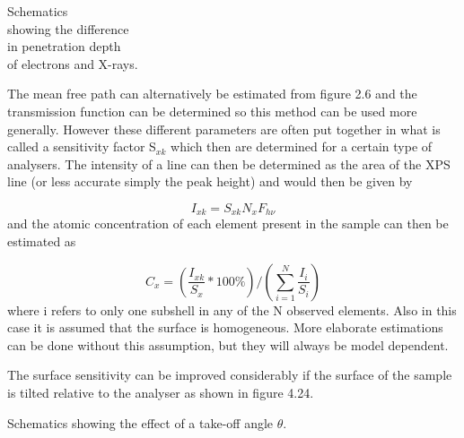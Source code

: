              Schematics\\ showing the
        difference\\ in penetration depth\\ of electrons and X-rays.\\

\vspace{9cm}


          The mean free  path  can  alternatively  be  estimated  from
          figure 2.6 and the transmission function can be determined
          so this method can be  used  more  generally.  However  these
          different parameters are often put together in what is
          called a sensitivity factor S$_{xk}$ which then are
          determined for a certain type of analysers. The intensity of
          a line can then be determined as the area of the XPS line
          (or less accurate simply the peak height) and would then be
          given by


            \begin{equation}
          I_{xk} = S_{xk}N_{x}F_{h\nu}
          \end{equation}
          and the atomic concentration of each element present in the
          sample can then be estimated as

            \begin{equation}
          C_{x} =
          (\frac{I_{xk}}{S_{x}}*100\%)/(\sum_{i=1}^{N}\frac{I_{i}}{S_{i}})
          \end{equation} where i refers to only one subshell in any of the N observed
          elements. Also in this case it is assumed that the surface
          is homogeneous. More elaborate estimations can be done
          without this assumption, but they will always be model
          dependent.







          The surface sensitivity can be improved considerably
          if the surface of the  sample  is  tilted  relative  to  the
          analyser as  shown  in  figure  4.24.\\
          \vspace*{8cm}


             Schematics showing the
        effect of a  take-off angle $\theta$.\\



